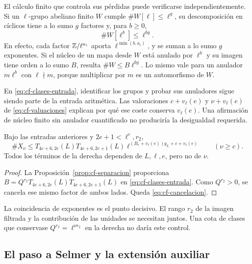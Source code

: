 El cálculo finito que controla sus pérdidas puede verificarse
independientemente. Si un $\ell$-grupo abeliano finito $W$ cumple
$\#W[\ell]\le\ell^g$, su descomposición en cíclicos tiene a
lo sumo $g$ factores y, para $b\ge0$,
\begin{equation}
 \#W[\ell^b]\le\ell^{bg}.
 \label{eq:cf-kernel-finito}
\end{equation}
En efecto, cada factor $\mathbb{Z}/\ell^{a_i}$ aporta
$\ell^{\min(b,a_i)}$, y se suman a lo sumo $g$ exponentes.
Si el núcleo de un mapa desde $W$ está anulado por $\ell^b$
y su imagen tiene orden a lo sumo $B$, resulta
$\#W\le B\ell^{bg}$. Lo mismo vale para un anulador
$m\ell^b$ con $\ell\nmid m$, porque multiplicar por $m$
es un automorfismo de $W$.

En \eqref{eq:cf-clases-entrada}, identificar los grupos y probar
sus anuladores sigue siendo parte de la entrada aritmética.
Las valoraciones $c+v_\ell(e)$ y $\nu+v_\ell(e)$ de
\eqref{eq:cf-valuaciones} explican por qué ese coste conserva
$v_\ell(e)$. Una afirmación de núcleo finito sin anulador
cuantificado no produciría la desigualdad requerida.

\begin{proposicion}
\label{prop:cf-cancelacion}
Bajo las entradas anteriores y $2e+1<\ell^c,r_2$,
\begin{equation}
 \#X_\nu
 \le T_{4e+6,2e}(L)T_{4e+6,2e+1}(L)
 \ell^{(B_e+v_\ell(e))g_L+c+v_\ell(e)}
 \qquad(\nu\ge c).
 \label{eq:cf-cancelacion}
\end{equation}
Todos los términos de la derecha dependen de $L,\ell,e$,
pero no de $\nu$.
\end{proposicion}

\begin{proof}
La Proposición~\ref{prop:cf-separacion} proporciona
$B=Q^{r_2}T_{4e+6,2e}(L)T_{4e+6,2e+1}(L)$
en \eqref{eq:cf-clases-entrada}.
Como $Q^{r_2}>0$, se cancela ese mismo factor de ambos lados.
Queda \eqref{eq:cf-cancelacion}.
\end{proof}

La coincidencia de exponentes es el punto decisivo. El rango
$r_2$ de la imagen filtrada y la contribución de las unidades
se necesitan juntos. Una cota de clases que conservase
$Q^{r_2}=\ell^{\nu r_2}$ en la derecha no daría este control.

\subsection{El paso a Selmer y la extensión auxiliar}

